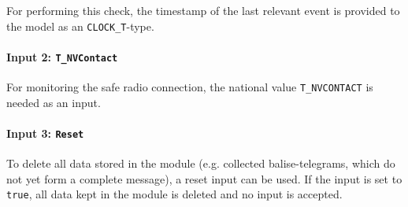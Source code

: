\documentclass{template/openetcs_report}
\begin{document}
For performing this check, the timestamp of the last relevant event is provided to the model as an \texttt{CLOCK\_T}-type.

\paragraph{Input 2: \texttt{T\_NVContact}}

For monitoring the safe radio connection, the national value \texttt{T\_NVCONTACT} is needed as an input.

\paragraph{Input 3: \texttt{Reset}}
To delete all data stored in the module (e.g. collected balise-telegrams, which do not yet form a complete message), a reset input can be used. If the input is set to \texttt{true}, all data kept in the module is deleted and no input is accepted.

%  
%  
%  
%  
 
\end{document}
